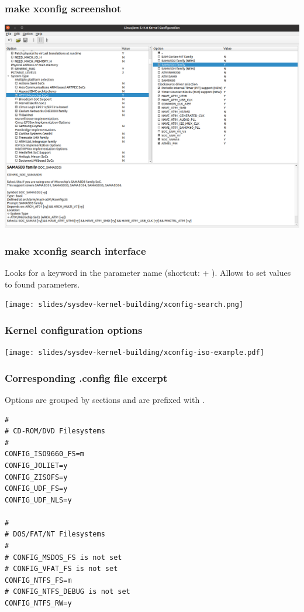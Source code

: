 \begin{frame}
  \frametitle{make xconfig screenshot}
  \begin{center}
    \includegraphics[height=0.8\textheight]{slides/sysdev-kernel-building/xconfig-screenshot.png}
  \end{center}
\end{frame}

\begin{frame}
  \frametitle{make xconfig search interface}
  Looks for a keyword in the parameter name (shortcut: \code{[Ctrl]} + \code{[f]}).
  \newline Allows to set values to found parameters.
  \begin{center}
    \texttt{[image: slides/sysdev-kernel-building/xconfig-search.png]}
  \end{center}
\end{frame}

\begin{frame}
\frametitle{Kernel configuration options}
  \begin{center}
    \texttt{[image: slides/sysdev-kernel-building/xconfig-iso-example.pdf]}
  \end{center}
\end{frame}

\begin{frame}[fragile]
  \frametitle{Corresponding .config file excerpt}
  Options are grouped by sections and are prefixed with
  .
\footnotesize
\begin{verbatim}
#
# CD-ROM/DVD Filesystems
#
CONFIG_ISO9660_FS=m
CONFIG_JOLIET=y
CONFIG_ZISOFS=y
CONFIG_UDF_FS=y
CONFIG_UDF_NLS=y

#
# DOS/FAT/NT Filesystems
#
# CONFIG_MSDOS_FS is not set
# CONFIG_VFAT_FS is not set
CONFIG_NTFS_FS=m
# CONFIG_NTFS_DEBUG is not set
CONFIG_NTFS_RW=y
\end{verbatim}
\end{frame}

